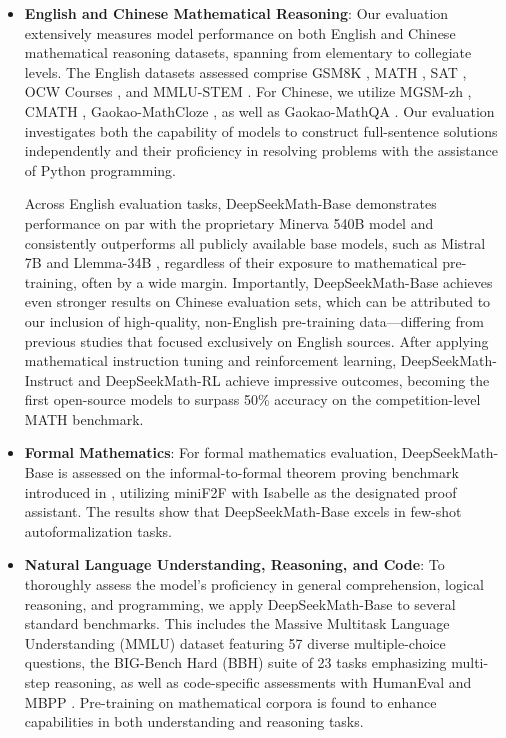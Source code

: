 \begin{itemize}[topsep=0pt]
    \item \textbf{English and Chinese Mathematical Reasoning}: Our evaluation extensively measures model performance on both English and Chinese mathematical reasoning datasets, spanning from elementary to collegiate levels. The English datasets assessed comprise GSM8K \citep{gsm8k}, MATH \citep{MATH}, SAT \citep{llemma}, OCW Courses \citep{minerva}, and MMLU-STEM \citep{mmlu}. For Chinese, we utilize MGSM-zh \citep{mgsm}, CMATH \citep{wei2023cmath}, Gaokao-MathCloze \citep{agieval}, as well as Gaokao-MathQA \citep{agieval}. Our evaluation investigates both the capability of models to construct full-sentence solutions independently and their proficiency in resolving problems with the assistance of Python programming.

Across English evaluation tasks, DeepSeekMath-Base demonstrates performance on par with the proprietary Minerva 540B model \citep{minerva} and consistently outperforms all publicly available base models, such as Mistral 7B \citep{mistral} and Llemma-34B \citep{llemma}, regardless of their exposure to mathematical pre-training, often by a wide margin. Importantly, DeepSeekMath-Base achieves even stronger results on Chinese evaluation sets, which can be attributed to our inclusion of high-quality, non-English pre-training data—differing from previous studies \citep{minerva,llemma} that focused exclusively on English sources. After applying mathematical instruction tuning and reinforcement learning, DeepSeekMath-Instruct and DeepSeekMath-RL achieve impressive outcomes, becoming the first open-source models to surpass 50\% accuracy on the competition-level MATH benchmark.

\item \textbf{Formal Mathematics}: For formal mathematics evaluation, DeepSeekMath-Base is assessed on the informal-to-formal theorem proving benchmark introduced in \citep{dsp_proof}, utilizing miniF2F \citep{minif2f} with Isabelle \citep{isabelle} as the designated proof assistant. The results show that DeepSeekMath-Base excels in few-shot autoformalization tasks.

\item \textbf{Natural Language Understanding, Reasoning, and Code}: To thoroughly assess the model's proficiency in general comprehension, logical reasoning, and programming, we apply DeepSeekMath-Base to several standard benchmarks. This includes the Massive Multitask Language Understanding (MMLU) dataset \citep{mmlu} featuring 57 diverse multiple-choice questions, the BIG-Bench Hard (BBH) suite \citep{bbh} of 23 tasks emphasizing multi-step reasoning, as well as code-specific assessments with HumanEval \citep{codex} and MBPP \citep{mbpp}. Pre-training on mathematical corpora is found to enhance capabilities in both understanding and reasoning tasks.


\end{itemize}
